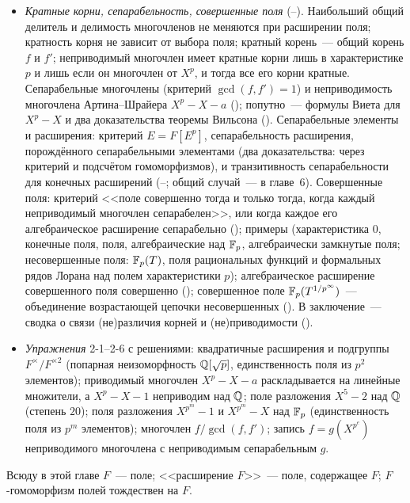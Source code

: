 \begin{itemize}[leftmargin=*]
корней; единственность поля разложения с точностью до изоморфизма (и отсутствие выделенного изоморфизма); оценка
$|\Hom_F(E,L)|\le[E:F]$ для любого $L$; общее конечное расширение, содержащее копии нескольких данных полей, и когда
такое общее расширение универсально (кодекартов квадрат, ).
\item \emph{Кратные корни, сепарабельность, совершенные поля} (--). Наибольший общий делитель и
делимость многочленов не меняются при расширении поля; кратность корня не зависит от выбора поля; кратный корень~---
общий корень $f$ и $f'$; неприводимый многочлен имеет кратные корни лишь в характеристике $p$ и лишь если он многочлен
от $X^p$, и тогда все его корни кратные. Сепарабельные многочлены (критерий $\gcd(f,f')=1$) и неприводимость многочлена
Артина--Шрайера $X^p-X-a$ (); попутно~--- формулы Виета для $X^p-X$ и два доказательства
теоремы Вильсона (). Сепарабельные элементы и расширения: критерий $E=F[E^p]$, сепарабельность
расширения, порождённого сепарабельными элементами (два доказательства: через критерий и подсчётом гомоморфизмов), и
транзитивность сепарабельности для конечных расширений (--; общий случай~--- в главе~6). Совершенные поля: критерий <<поле совершенно тогда и только тогда,
когда каждый неприводимый многочлен сепарабелен>>, или когда каждое его алгебраическое расширение сепарабельно
(); примеры (характеристика $0$, конечные поля, поля, алгебраические над $\mathbb F_p$, алгебраически замкнутые поля;
несовершенные поля: $\mathbb F_p(T)$, поля рациональных функций и формальных рядов Лорана над полем характеристики $p$); алгебраическое расширение совершенного
поля совершенно (); совершенное поле $\mathbb F_p(T^{1/p^\infty})$~--- объединение возрастающей цепочки несовершенных
(). В заключение~--- сводка о связи (не)различия корней и (не)приводимости ().
\item \emph{Упражнения} 2-1--2-6 с решениями: квадратичные расширения и подгруппы $F^\times/F^{\times2}$ (попарная
неизоморфность $\mathbb Q[\sqrt p]$, единственность поля из $p^2$ элементов); приводимый многочлен $X^p-X-a$ раскладывается
на линейные множители, а $X^p-X-1$ неприводим над $\mathbb Q$; поле разложения $X^5-2$ над $\mathbb Q$ (степень $20$); поля
разложения $X^{p^m}-1$ и $X^{p^m}-X$ над $\mathbb F_p$ (единственность поля из $p^m$ элементов); многочлен $f/\gcd(f,f')$;
запись $f=g(X^{p^e})$ неприводимого многочлена с неприводимым сепарабельным $g$.
\end{itemize}

Всюду в этой главе $F$~--- поле; <<расширение $F$>>~--- поле, содержащее $F$; $F$-гомоморфизм полей тождествен на $F$.
